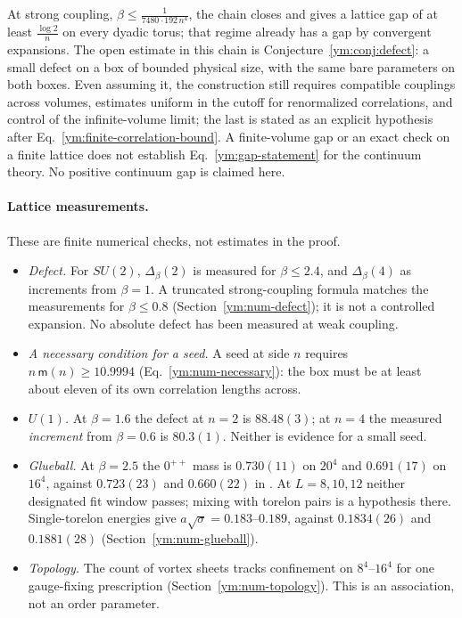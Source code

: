 At strong coupling, $\beta\le\frac{1}{7480\cdot192\,n^4}$, the chain closes
and gives a lattice gap of at least $\frac{\log2}{n}$ on every dyadic torus;
that regime already has a gap by convergent expansions. The open estimate in
this chain is Conjecture~\ref{ym:conj:defect}: a small defect on a box of
bounded physical size, with the same bare parameters on both boxes. Even
assuming it, the construction still requires compatible couplings across
volumes, estimates uniform in the cutoff for renormalized correlations, and
control of the infinite-volume limit; the last is stated as an explicit
hypothesis after Eq.~\eqref{ym:finite-correlation-bound}. A finite-volume gap
or an exact check on a finite lattice does not establish
Eq.~\eqref{ym:gap-statement} for the continuum theory. No positive continuum
gap is claimed here.

\paragraph{Lattice measurements.}
These are finite numerical checks, not estimates in the proof.
\begin{itemize}
\item \emph{Defect.} For $SU(2)$, $\Delta_\beta(2)$ is measured for $\beta\le2.4$,
 and $\Delta_\beta(4)$ as increments from $\beta=1$. A truncated
 strong-coupling formula matches the measurements for $\beta\le0.8$
 (Section~\ref{ym:num-defect}); it is not a controlled expansion. No absolute
 defect has been measured at weak coupling.
\item \emph{A necessary condition for a seed.} A seed at side $n$ requires
 $n\,\mathsf m(n)\ge10.9994$ (Eq.~\eqref{ym:num-necessary}): the box must be
 at least about eleven of its own correlation lengths across.
\item \emph{$U(1)$.} At $\beta=1.6$ the defect at $n=2$ is $88.48(3)$;
 at $n=4$ the measured \emph{increment} from $\beta=0.6$ is $80.3(1)$.
 Neither is evidence for a small seed.
\item \emph{Glueball.} At $\beta=2.5$ the $0^{++}$ mass is $0.730(11)$ on
 $20^4$ and $0.691(17)$ on $16^4$, against $0.723(23)$ and $0.660(22)$ in
 \cite{Teper1998}. At $L=8,10,12$ neither designated fit window passes; mixing with
 torelon pairs is a hypothesis there. Single-torelon energies give
 $a\sqrt\sigma=0.183$--$0.189$, against $0.1834(26)$ and $0.1881(28)$
 (Section~\ref{ym:num-glueball}).
\item \emph{Topology.} The count of vortex sheets tracks confinement on
 $8^4$--$16^4$ for one gauge-fixing prescription
 (Section~\ref{ym:num-topology}). This is an association, not an order
 parameter.
\end{itemize}

